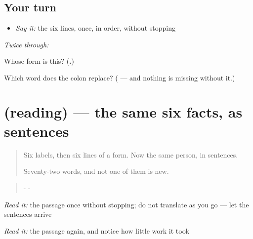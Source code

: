 \subsection*{Your turn}
\begin{itemize}
\raggedright
  \item \emph{Say it:} the six lines, once, in order, without stopping
\end{itemize}

\emph{Twice through:}

\begin{tcolorbox}[breakable,colback=teal!4,colframe=teal!35!black,title={Before you move on}]
Whose form is this? (\textbf{.})

Which word does the colon replace? (\textbf{} — and nothing is missing without it.)
\end{tcolorbox}
\section[(reading)]{(reading) — the same six facts, as sentences}

\label{lesson:PA-C45-pehla-paath}



\begin{quote}
Six labels, then six lines of a form. Now the same person, in sentences.

Seventy-two words, and not one of them is new.
\end{quote}

\begin{tcolorbox}[breakable,skin=enhanced,colback=orange!6,colframe=orange!45!black,boxrule=0.5pt,arc=1mm,left=6pt,right=6pt,top=4pt,bottom=4pt,fonttitle=\bfseries,title={Read this}]
\begin{quote}
                             -                  -                        
\end{quote}

\emph{Read it:} the passage once without stopping; do not translate as you go — let the sentences arrive

\emph{Read it:} the passage again, and notice how little work it took
\end{tcolorbox}

